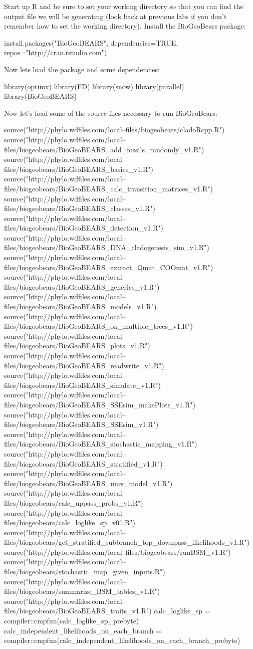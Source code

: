 \documentclass[11pt]{article}
\begin{document}
Start up R and be sure to set your working directory so that you can
find the output file we will be generating (look back at
previous labs if you don't remember how to set the working directory). 
Install the BioGeoBears package:
\begin{code}
install.packages("BioGeoBEARS", dependencies=TRUE, repos="http://cran.rstudio.com")
\end{code}
Now lets load the package and some dependencies:
\begin{code}
library(optimx)
library(FD)
library(snow)
library(parallel)
library(BioGeoBEARS)
\end{code}
Now let's load some of the source files necessary to run BioGeoBears:
\begin{code}
source("http://phylo.wdfiles.com/local--files/biogeobears/cladoRcpp.R")
source("http://phylo.wdfiles.com/local--files/biogeobears/BioGeoBEARS_add_fossils_randomly_v1.R")
source("http://phylo.wdfiles.com/local--files/biogeobears/BioGeoBEARS_basics_v1.R")
source("http://phylo.wdfiles.com/local--files/biogeobears/BioGeoBEARS_calc_transition_matrices_v1.R")
source("http://phylo.wdfiles.com/local--files/biogeobears/BioGeoBEARS_classes_v1.R")
source("http://phylo.wdfiles.com/local--files/biogeobears/BioGeoBEARS_detection_v1.R")
source("http://phylo.wdfiles.com/local--files/biogeobears/BioGeoBEARS_DNA_cladogenesis_sim_v1.R")
source("http://phylo.wdfiles.com/local--files/biogeobears/BioGeoBEARS_extract_Qmat_COOmat_v1.R")
source("http://phylo.wdfiles.com/local--files/biogeobears/BioGeoBEARS_generics_v1.R")
source("http://phylo.wdfiles.com/local--files/biogeobears/BioGeoBEARS_models_v1.R")
source("http://phylo.wdfiles.com/local--files/biogeobears/BioGeoBEARS_on_multiple_trees_v1.R")
source("http://phylo.wdfiles.com/local--files/biogeobears/BioGeoBEARS_plots_v1.R")
source("http://phylo.wdfiles.com/local--files/biogeobears/BioGeoBEARS_readwrite_v1.R")
source("http://phylo.wdfiles.com/local--files/biogeobears/BioGeoBEARS_simulate_v1.R")
source("http://phylo.wdfiles.com/local--files/biogeobears/BioGeoBEARS_SSEsim_makePlots_v1.R")
source("http://phylo.wdfiles.com/local--files/biogeobears/BioGeoBEARS_SSEsim_v1.R")
source("http://phylo.wdfiles.com/local--files/biogeobears/BioGeoBEARS_stochastic_mapping_v1.R")
source("http://phylo.wdfiles.com/local--files/biogeobears/BioGeoBEARS_stratified_v1.R")
source("http://phylo.wdfiles.com/local--files/biogeobears/BioGeoBEARS_univ_model_v1.R")
source("http://phylo.wdfiles.com/local--files/biogeobears/calc_uppass_probs_v1.R")
source("http://phylo.wdfiles.com/local--files/biogeobears/calc_loglike_sp_v01.R")
source("http://phylo.wdfiles.com/local--files/biogeobears/get_stratified_subbranch_top_downpass_likelihoods_v1.R")
source("http://phylo.wdfiles.com/local--files/biogeobears/runBSM_v1.R")
source("http://phylo.wdfiles.com/local--files/biogeobears/stochastic_map_given_inputs.R")
source("http://phylo.wdfiles.com/local--files/biogeobears/summarize_BSM_tables_v1.R")
source("http://phylo.wdfiles.com/local--files/biogeobears/BioGeoBEARS_traits_v1.R")
calc_loglike_sp = compiler::cmpfun(calc_loglike_sp_prebyte)
calc_independent_likelihoods_on_each_branch = compiler::cmpfun(calc_independent_likelihoods_on_each_branch_prebyte)
\end{code}
\end{document}
